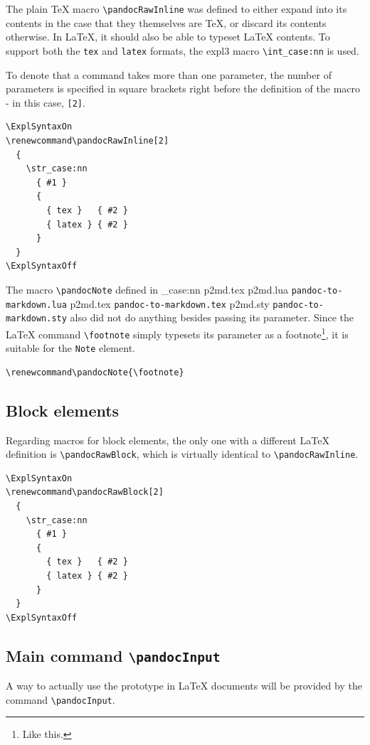 \documentclass[
  digital,     %
  oneside,     %
  nosansbold,  %
  nocolorbold, %
  lof,         %
  nolot,       %
]{fithesis4}
\newcommand\macro[1]{\texttt{\textbackslash{}{#1}}}
\newcommand\file[1]
  {
    \str_case:nn
      { #1 }
      {
        { p2md.lua } { \texttt{pandoc\hyp{}to\hyp{}markdown.lua} }
        { p2md.tex } { \texttt{pandoc\hyp{}to\hyp{}markdown.tex} }
        { p2md.sty } { \texttt{pandoc\hyp{}to\hyp{}markdown.sty} }
      }
  }
\begin{document}
\noindent
The plain \TeX{} macro \macro{pandocRawInline} was defined to either expand into its contents in the case that they themselves are \TeX{}, or discard its contents otherwise. In \LaTeX{}, it should also be able to typeset \LaTeX{} contents. To support both the \texttt{tex} and \texttt{latex} formats, the expl3 macro \macro{int\_case:nn} is used.

To denote that a command takes more than one parameter, the number of parameters is specified in square brackets right before the definition of the macro - in this case, \texttt{[2]}.

\noindent
\lstset{language=[LaTeX]TeX}
\begin{lstlisting}
\ExplSyntaxOn
\renewcommand\pandocRawInline[2]
  {
    \str_case:nn
      { #1 }
      {
        { tex }   { #2 }
        { latex } { #2 }
      }
  }
\ExplSyntaxOff
\end{lstlisting}

\noindent
The macro \macro{pandocNote} defined in \file{p2md.tex} also did not do anything besides passing its parameter. Since the \LaTeX{} command \macro{footnote} simply typesets its parameter as a footnote\footnote{Like this.}, it is suitable for the \texttt{Note} element.

\noindent
\lstset{language=[LaTeX]TeX}
\begin{lstlisting}
\renewcommand\pandocNote{\footnote}
\end{lstlisting}

\subsection{Block elements}
Regarding macros for block elements, the only one with a different \LaTeX{} definition is \macro{pandocRawBlock}, which is virtually identical to \macro{pandocRawInline}.

\noindent
\lstset{language=[LaTeX]TeX}
\begin{lstlisting}
\ExplSyntaxOn
\renewcommand\pandocRawBlock[2]
  {
    \str_case:nn
      { #1 }
      {
        { tex }   { #2 }
        { latex } { #2 }
      }
  }
\ExplSyntaxOff
\end{lstlisting}

\subsection{Main command \macro{pandocInput}}
A way to actually use the prototype in \LaTeX{} documents will be provided by the command \macro{pandocInput}.
\end{document}
